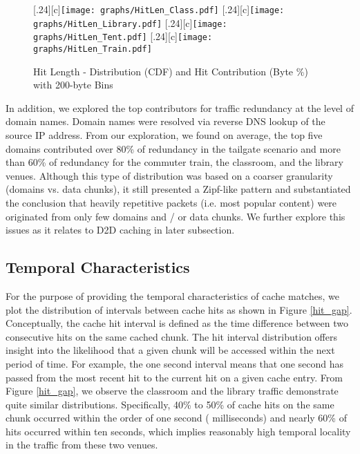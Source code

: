 \documentclass{sig-alternate}
\begin{document}
\begin{figure*}[t!]
\centering
  [.24\linewidth][c]{\texttt{[image: graphs/HitLen\_Class.pdf]}} 
  [.24\linewidth][c]{\texttt{[image: graphs/HitLen\_Library.pdf]}}
  [.24\linewidth][c]{\texttt{[image: graphs/HitLen\_Tent.pdf]}}
  [.24\linewidth][c]{\texttt{[image: graphs/HitLen\_Train.pdf]}}  
\caption{Hit Length - Distribution (CDF) and Hit Contribution (Byte \%) with 200-byte Bins} 
\label{hit_len}
\end{figure*}

In addition, we explored the top contributors for traffic redundancy at the level of domain names. Domain names were resolved via reverse DNS lookup of the source IP address.  From our exploration, we found on average, the top five domains contributed over 80\% of redundancy in the tailgate scenario and more than 60\% of redundancy for the commuter train, the classroom, and the library venues. Although this type of distribution was based on a coarser granularity (domains vs. data chunks), it still presented a Zipf-like pattern and substantiated the conclusion that heavily repetitive packets (i.e. most popular content) were originated from only few domains and / or data chunks. We further explore this issues as it relates to D2D caching in later subsection.


\subsection{Temporal Characteristics}

For the purpose of providing the temporal characteristics of cache matches, we plot the distribution of intervals between cache hits as shown in Figure \ref{hit_gap}. Conceptually, the cache hit interval is defined as the time difference between two consecutive hits on the same cached chunk. The hit interval distribution offers insight into the likelihood that a given chunk will be accessed within the next period of time. For example, the one second interval means that one second has passed from the most recent hit to the current hit on a given cache entry. From Figure \ref{hit_gap}, we observe the classroom and the library traffic demonstrate quite similar distributions. Specifically, 40\% to 50\% of cache hits on the same chunk occurred within the order of one second ( milliseconds) and nearly 60\% of hits occurred within ten seconds, which implies reasonably high temporal locality in the traffic from these two venues.  
\end{document}
